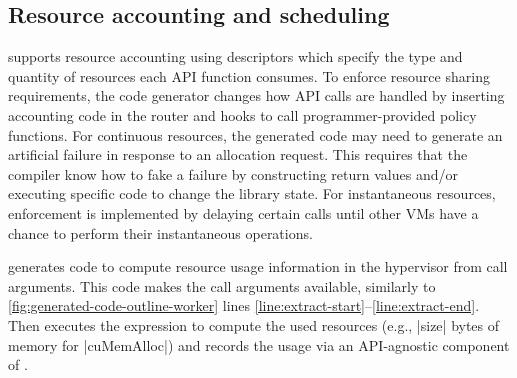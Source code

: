 {\subsection{Resource accounting and scheduling}

\Compiler supports resource accounting using \speclang descriptors which specify the type and quantity of resources each API function consumes.
To enforce resource sharing requirements, the code generator changes how API calls are handled by inserting accounting code in the router and hooks to call programmer-provided policy functions.
For continuous resources, the generated code may need to generate an artificial failure in response to an allocation request.
This requires that the compiler know how to fake a failure by constructing return values and/or executing specific code to change the library state.
For instantaneous resources, enforcement is implemented by delaying certain calls until other VMs have a chance to perform their instantaneous operations.

\Compiler generates code to compute resource usage information in the hypervisor from call arguments.
This code makes the call arguments available, similarly to \autoref{fig:generated-code-outline-worker} lines \ref{line:extract-start}--\ref{line:extract-end}.
Then executes the expression to compute the used resources (e.g., \spec|size| bytes of memory for \spec|cuMemAlloc|) and records the usage via an API-agnostic component of \model.


}

